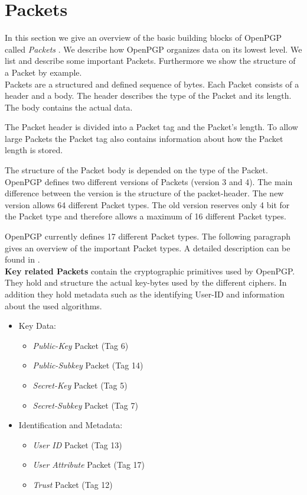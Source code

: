 \section{Packets}
\label{section:messageformat:packets}

In this section we give an overview of the basic building blocks of OpenPGP called \textit{Packets} \cite[section 5]{RFC4880}. We describe how OpenPGP organizes data on its lowest level. We list and describe some important Packets. Furthermore we show the structure of a Packet by example.  \\


Packets are a structured and defined sequence of bytes.  Each Packet consists of a header and a body. The header describes the type of the Packet and its length. The body contains the actual data.

The Packet header is divided into a Packet tag and the Packet's length. To allow large Packets the Packet tag also contains information about how the Packet length is stored. 

The structure of the Packet body is depended on the type of the Packet. \\


OpenPGP defines two different versions of Packets (version 3 and 4). The main difference between the version is the structure of the packet-header. The new version allows 64 different Packet types. The old version reserves only 4 bit for the Packet type and therefore allows a maximum of 16 different Packet types.

OpenPGP currently defines 17 different Packet types. The following paragraph gives an overview of the important Packet types. A detailed description can be found in \cite[section 5]{RFC4880}. \\ 


\textbf{Key related Packets} contain the cryptographic primitives used by OpenPGP. They hold and structure the actual key-bytes used by the different ciphers. In addition they hold metadata such as the identifying User-ID and information about the used algorithms.

\begin{itemize}
	\item Key Data:
	\begin{itemize}
		\item \textit{Public-Key} Packet (Tag 6)
		\item \textit{Public-Subkey} Packet (Tag 14)
		\item \textit{Secret-Key} Packet (Tag 5)
		\item \textit{Secret-Subkey} Packet (Tag 7)
	\end{itemize}
	\item Identification and Metadata:
	\begin{itemize}
		\item \textit{User ID} Packet (Tag 13)
		\item \textit{User Attribute} Packet (Tag 17)
		\item \textit{Trust} Packet (Tag 12)
	\end{itemize}
\end{itemize}

